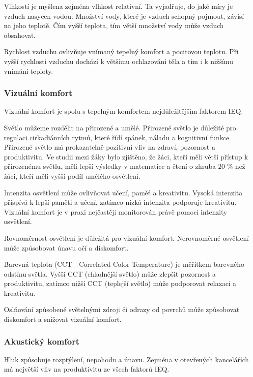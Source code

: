 Vlhkostí je myšlena zejména vlhkost relativní. Ta vyjadřuje, do jaké míry je vzduch nasycen vodou. Množství vody, které je vzduch schopný pojmout, závisí na jeho teplotě. \parencite{dengImpactIndoorAir2024} Čím vyšší teplota, tím větší množství vody může vzduch obsahovat. \parencite{VlhkostVzduchu2024}

Rychlost vzduchu ovlivňuje vnímaný tepelný komfort a pocitovou teplotu. Při vyšší rychlosti vzduchu dochází k většímu ochlazování těla a tím i k nižšímu vnímání teploty. \parencite{dengImpactIndoorAir2024}
\subsubsection{Vizuální komfort}
Vizuální komfort je spolu s tepelným komfortem nejdůležitějším faktorem IEQ.

Světlo můžeme rozdělit na přirozené a umělé. Přirozené světlo je důležité pro regulaci cirkadiánních rytmů, které řídí spánek, náladu a kognitivní funkce. Přirozené světlo má prokazatelně pozitivní vliv na zdraví, pozornost a produktivitu. Ve studii mezi žáky bylo zjištěno, že žáci, kteří měli větší přístup k přirozenému světlu, měli lepší výsledky v matematice a čtení o zhruba 20 \% než žáci, kteří měli vyšší podíl umělého osvětlení. \parencite{dengImpactIndoorAir2024} 

Intenzita osvětlení může ovlivňovat učení, paměť a kreativitu. Vysoká intenzita přispívá k lepší paměti a učení, zatímco nízká intenzita podporuje kreativitu. Vizuální komfort je v praxi nejčastěji monitorován právě pomocí intenzity osvětlení. \parencite{dengImpactIndoorAir2024}

Rovnoměrnost osvětlení je důležitá pro vizuální komfort. Nerovnoměrné osvětlení může způsobovat únavu očí a diskomfort. \parencite{dengImpactIndoorAir2024}

Barevná teplota (CCT - Correlated Color Temperature) je měřítkem barevného odstínu světla. Vyšší CCT (chladnější světlo) může zlepšit pozornost a produktivitu, zatímco nižší CCT (teplejší světlo) může podporovat relaxaci a kreativitu. \parencite{dengImpactIndoorAir2024}

Oslňování způsobené světelnými zdroji či odrazy od povrchů může způsobovat diskomfort a snižovat vizuální komfort. \parencite{dengImpactIndoorAir2024}

\subsubsection{Akustický komfort}
Hluk způsobuje rozptýlení, nepohodu a únavu. Zejména v otevřených kancelářích má největší vliv na produktivitu ze všech faktorů IEQ. \parencite{dengImpactIndoorAir2024}

